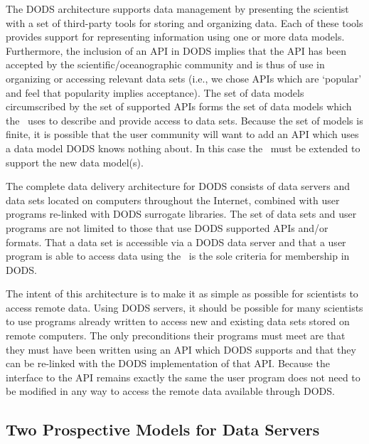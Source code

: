 The DODS architecture supports data management by presenting the scientist
with a set of third-party tools for storing and organizing data. Each of
these tools provides support for representing information using one or more
data models. Furthermore, the inclusion of an API in DODS implies that the
API has been accepted by the scientific/oceanographic community and is thus
of use in organizing or accessing relevant data sets (i.e., we chose APIs
which are `popular' and feel that popularity implies acceptance). The set of
data models circumscribed by the set of supported APIs forms the set of data
models which the \dap\ uses to describe and provide access to data
sets. Because the set of models is finite, it is possible that the user
community will want to add an API which uses a data model DODS knows nothing
about. In this case the \dap\ must be extended to support the new data
model(s).

The complete data delivery architecture for DODS consists of data servers and
data sets located on computers throughout the Internet, combined with user
programs re-linked with DODS surrogate libraries. The set of data sets and
user programs are not limited to those that use DODS supported APIs and/or
formats. That a data set is accessible via a DODS data server and that a user
program is able to access data using the \dap\ is the sole criteria for
membership in DODS\@.

The intent of this architecture is to make it as simple as possible for
scientists to access remote data. Using DODS servers, it should be possible
for many scientists to use programs already written to access new and
existing data sets stored on remote computers. The only preconditions their
programs must meet are that they must have been written using an API which
DODS supports and that they can be re-linked with the DODS implementation of
that API\@. Because the interface to the API remains exactly the same the user
program does not need to be modified in any way to access the remote data
available through DODS\@.

\subsection{Two Prospective Models for Data Servers}

